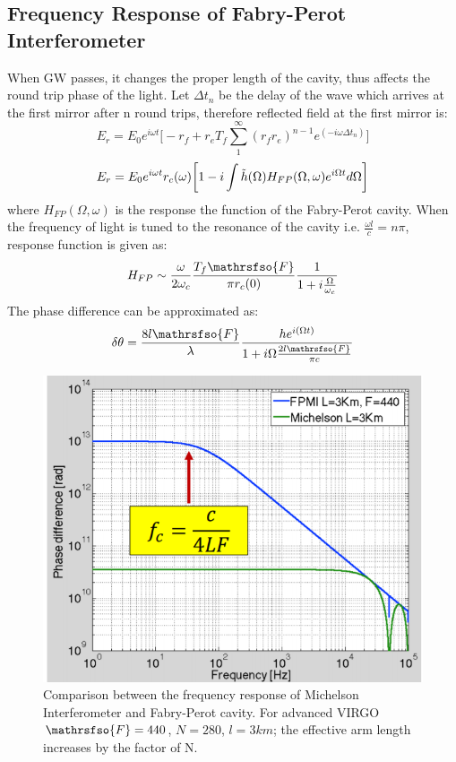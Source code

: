 \documentclass[conference]{IEEEtran}
\begin{document}
\subsection{Frequency Response of Fabry-Perot Interferometer}
When GW passes, it changes the proper length of the cavity, thus affects the round trip phase of the light. Let $\Delta t_n$ be the delay of the wave which arrives at the first mirror after n round trips, therefore reflected field at the first mirror is\cite{article6}:
\begin{equation}
E_r=E_0e^{i \omega t}\big[-r_f+r_eT_f\sum_{1}^{\infty}(r_fr_e)^{n-1}e^{(-i\omega\Delta t_n)}\big]    
\end{equation}
\begin{equation}
E_r=E_0e^{i\omega t}r_c{(\omega)}\bigg[1-i\int \Tilde{h}{(\Omega)}H_{FP}(\Omega,\omega)e^{i\Omega t}d\Omega\bigg] 
\end{equation}
where $H_{FP}(\Omega , \omega)$ is the response the function of the Fabry-Perot cavity. When the frequency of light is tuned to the resonance of the cavity i.e. $\frac{\omega l}{c}=n\pi$, response function is given as:
\begin{equation}
H_{FP}\sim \frac{\omega}{2\omega_c}\frac{T_f\mathrsfso{F}}{\pi r_c{(0)}}\frac{1}{1+i\frac{\Omega}{\omega_c}}
\end{equation}
The phase difference can be approximated as:
\begin{equation}
\delta \theta = \frac{8l\mathrsfso{F}}{\lambda}\frac{he^{i(\Omega t)}}{1+i\Omega \frac{2l\mathrsfso{F}}{\pi c}}
\end{equation}
\begin{figure}[htbp]
\centerline{\includegraphics[scale=0.5]{Capture.PNG}}
\caption{Comparison between the frequency response of Michelson Interferometer and Fabry-Perot cavity. For advanced VIRGO $\mathrsfso{F}=440$, $N=280$, $l=3km$; the effective arm length increases by the factor of N\cite{Bertolini:2017}.}

\end{figure}
\end{document}
